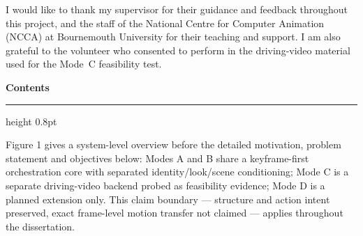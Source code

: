 \documentclass[10pt,twocolumn,letterpaper]{article}
\begin{document}
\vspace{10pt}{\centering\large\bfseries Acknowledgements\par}\vspace{4pt}
{\small I would like to thank my supervisor for their guidance and feedback throughout this project, and the staff of the National Centre for Computer Animation (NCCA) at Bournemouth University for their teaching and support. I am also grateful to the volunteer who consented to perform in the driving-video material used for the Mode~C feasibility test.\par}
\clearpage
{}
{\centering\LARGE\bfseries Contents\par}\vspace{4pt}
\begingroup
\scriptsize
\setlength{\parskip}{0pt}
\makeatletter
\renewcommand*\l@section[2]{%
  \ifnum \c@tocdepth >\z@
    \addpenalty\@secpenalty
    \addvspace{0.15em \@plus\p@}%
    \setlength\@tempdima{1.5em}%
    \begingroup
      \parindent \z@ \rightskip \@pnumwidth
      \parfillskip -\@pnumwidth
      \leavevmode \bfseries
      \advance\leftskip\@tempdima
      \hskip -\leftskip
      #1\nobreak\hfil \nobreak\hbox to\@pnumwidth{\hss #2}\par
    \endgroup
  \fi}%
\makeatother
\endgroup
\clearpage
\twocolumn
{}

\vspace*{2pt}\vspace{3pt}\hrule height 0.8pt\vspace{12pt}

Figure 1 gives a system-level overview before the detailed motivation, problem statement and objectives below: Modes A and B share a keyframe-first orchestration core with separated identity/look/scene conditioning; Mode C is a separate driving-video backend probed as feasibility evidence; Mode D is a planned extension only. This claim boundary --- structure and action intent preserved, exact frame-level motion transfer not claimed --- applies throughout the dissertation.
\end{document}
